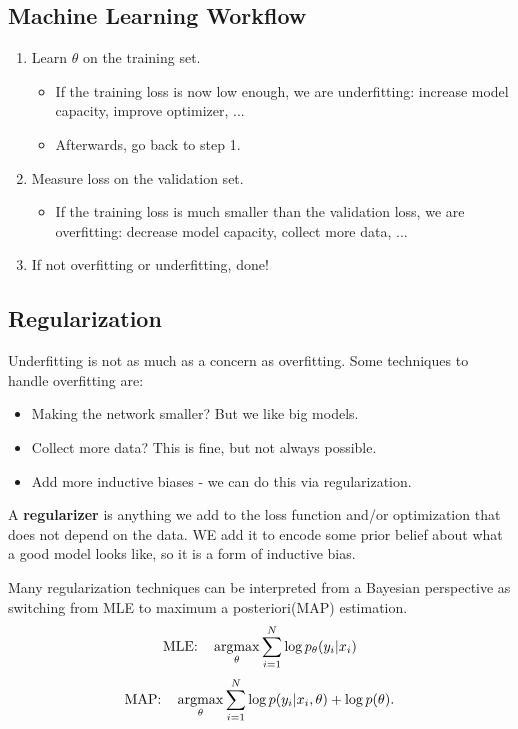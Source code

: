 \documentclass[11pt]{scrartcl}
\newcommand{\1}{\textbf{1}} %
\begin{document}
\subsection{Machine Learning Workflow}
\begin{enumerate}
\item Learn $\theta$ on the training set.
\begin{itemize}
\item If the training loss is now low enough, we are underfitting: increase model capacity, improve optimizer, ...
\item Afterwards, go back to step 1.
\end{itemize}
\item Measure loss on the validation set.
\begin{itemize}
\item If the training loss is much smaller than the validation loss, we are overfitting: decrease model capacity, collect more data, ...
\end{itemize}
\item If not overfitting or underfitting, done!
\end{enumerate}

\subsection{Regularization}
Underfitting is not as much as a concern as overfitting. Some techniques to handle overfitting are:
\begin{itemize}
\item Making the network smaller? But we like big models.
\item Collect more data? This is fine, but not always possible.
\item Add more inductive biases - we can do this via regularization.
\end{itemize}

A \textbf{regularizer} is anything we add to the loss function and/or optimization that does not depend on the data.  WE add it to encode some prior belief about what a good model looks like, so it is a form of inductive bias.

Many regularization techniques can be interpreted from a Bayesian perspective as switching from MLE to maximum a posteriori(MAP) estimation.
$$\text{MLE:} \quad \operatorname*{arg max}_{\theta} \sum_{i=1}^N \log p_\theta(y_i | x_i)$$
$$\text{MAP:} \quad \operatorname*{arg max}_{\theta} \sum_{i=1}^N \log p(y_i| x_i, \theta) + \log p(\theta).$$
\end{document}
